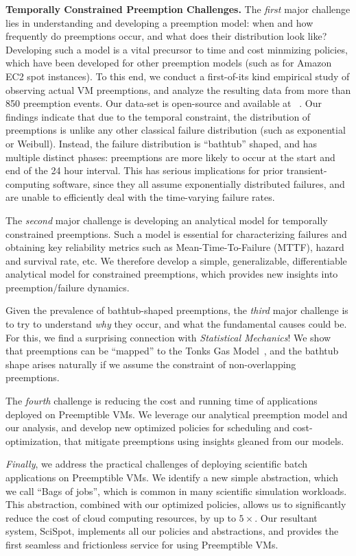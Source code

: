 \noindent \textbf{Temporally Constrained Preemption Challenges.}
The \emph{first} major challenge lies in understanding and developing a preemption model: when and how frequently do preemptions occur, and what does their distribution look like?
Developing such a model is a vital precursor to time and cost minmizing policies, which have been developed for other preemption models (such as for Amazon EC2 spot instances). 
To this end, we conduct a first-of-its kind empirical study of observing actual VM preemptions, and analyze the resulting data from more than 850 preemption events.
Our data-set is open-source and available at ~\cite{scispot-dataset}. 
Our findings indicate that due to the temporal constraint, the distribution of preemptions is unlike any other classical failure distribution (such as exponential or Weibull).
Instead, the failure distribution is ``bathtub'' shaped, and has multiple distinct phases: preemptions are more likely to occur at the start and end of the 24 hour interval. 
This has serious implications for prior transient-computing software, since they all assume exponentially distributed failures, and are unable to efficiently deal with the time-varying failure rates.

The \emph{second} major challenge is developing an analytical model for temporally constrained preemptions.
Such a model is essential for characterizing failures and obtaining key reliability metrics such as Mean-Time-To-Failure (MTTF), hazard and survival rate, etc.
We therefore develop a simple, generalizable, differentiable analytical model for constrained preemptions, which provides new insights into preemption/failure dynamics.

Given the prevalence of bathtub-shaped preemptions, the \emph{third} major challenge is to try to understand \emph{why} they occur, and what the fundamental causes could be. 
For this, we find a surprising connection with \emph{Statistical Mechanics}!
We show that preemptions can be ``mapped'' to the Tonks Gas Model~\cite{tonks, krauth2006statistical}, and the bathtub shape arises naturally if we assume the constraint of non-overlapping preemptions. 

The \emph{fourth} challenge is reducing the cost and running time of applications deployed on Preemptible VMs.
We leverage our analytical preemption model and our analysis, and develop new optimized policies for scheduling and cost-optimization, that mitigate preemptions using insights gleaned from our models.


\emph{Finally}, we address the practical challenges of deploying scientific batch applications on Preemptible VMs. 
We identify a new simple abstraction, which we call ``Bags of jobs'', which is common in many scientific simulation workloads. 
This abstraction, combined with our optimized policies, allows us to significantly reduce the cost of cloud computing resources, by up to $5\times$.
Our resultant system, SciSpot, implements all our policies and abstractions, and provides the first seamless and frictionless service for using Preemptible VMs. 


